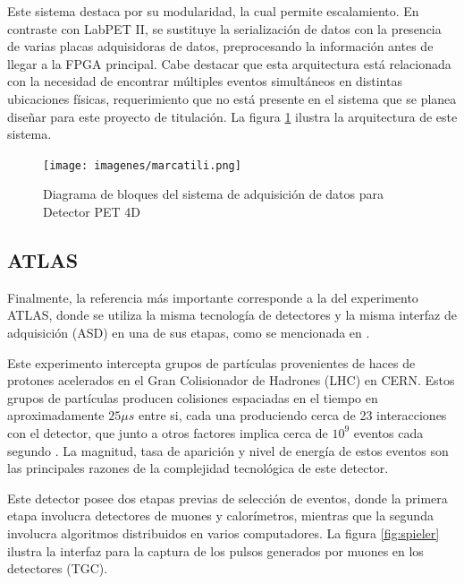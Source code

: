 \par Este sistema destaca por su modularidad, la cual permite escalamiento. En contraste con LabPET II, se sustituye la serialización de datos con la presencia de varias placas adquisidoras de datos, preprocesando la información antes de llegar a la FPGA principal. Cabe destacar que esta arquitectura está relacionada con la necesidad de encontrar múltiples eventos simultáneos en distintas ubicaciones físicas, requerimiento que no está presente en el sistema que se planea diseñar para este proyecto de titulación. La figura \ref{fig:marcatili} ilustra la arquitectura de este sistema.

\begin{figure}[H]
	\centering
	\texttt{[image: imagenes/marcatili.png]}
	\caption{Diagrama de bloques del sistema de adquisición de datos para Detector PET 4D \cite{Marcatili2011DevelopmentDetector}}
	\label{fig:marcatili}
\end{figure}

\newpage
\subsection{ATLAS}

\par Finalmente, la referencia más importante corresponde a la del experimento ATLAS, donde se utiliza la misma tecnología de detectores y la misma interfaz de adquisición (ASD) en una de sus etapas, como se mencionada en \cite{Spieler2012ElectronicsAcquisition}.

\par Este experimento intercepta grupos de partículas provenientes de haces de protones acelerados en el Gran Colisionador de Hadrones (LHC) en CERN. Estos grupos de partículas producen colisiones espaciadas en el tiempo en aproximadamente $25\mu s$ entre si, cada una produciendo cerca de 23 interacciones con el detector, que junto a otros factores implica cerca de $10^9$ eventos cada segundo \cite{Whiteson2016TheSystem}. La magnitud, tasa de aparición y nivel de energía de estos eventos son las principales razones de la complejidad tecnológica de este detector.

\par Este detector posee dos etapas previas de selección de eventos, donde la primera etapa involucra detectores de muones y calorímetros, mientras que la segunda involucra algoritmos distribuidos en varios computadores. La figura \ref{fig:spieler} ilustra la interfaz para la captura de los pulsos generados por muones en los detectores (TGC).


